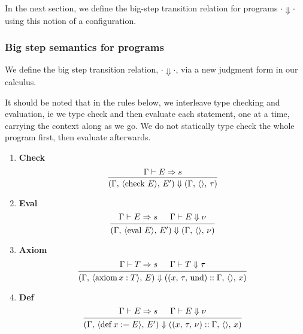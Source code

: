 \documentclass{article}
\begin{document}
In the next section, we define the big-step transition relation for programs $\cdot
\Downarrow \cdot$ using
this notion of a configuration.

\subsubsection{Big step semantics for programs}
We define the big step transition relation, $\cdot \Downarrow \cdot$, via a
new judgment form in our calculus.

It should be noted that in the rules below, we interleave type checking and 
evaluation, ie we type check and then evaluate each statement, one at a time,
carrying the context along as we go.
We do not statically type check the whole program first, then evaluate
afterwards.

\begin{enumerate}
\item \textbf{Check} \\
  \[
    \begin{prooftree}
      \hypo{\Gamma \vdash E \Rightarrow s}
      \infer1{(\Gamma, \, \langle \checkk \, E \rangle, \, E') \Downarrow
        (\Gamma, \, \langle \rangle, \, \tau)}
    \end{prooftree}
  \]

\item \textbf{Eval} \\
  \[
    \begin{prooftree}
      \hypo{\Gamma \vdash E \Rightarrow s}
      \hypo{\Gamma \vdash E \Downarrow \nu}
      \infer2{(\Gamma, \, \langle \evall \, E \rangle, \, E') \Downarrow
        (\Gamma, \, \langle \rangle, \, \nu)}
    \end{prooftree}
  \]

\item \textbf{Axiom} \\
  \[
    \begin{prooftree}
      \hypo{\Gamma \vdash T \Rightarrow s}
      \hypo{\Gamma \vdash T \Downarrow \tau}
      \infer2{(\Gamma, \, \langle \axiom x : T \rangle, \, E) \Downarrow
        ((x, \, \tau, \, \text{und}) :: \Gamma, \, \langle \rangle, \, x)}
    \end{prooftree}
  \]

\item \textbf{Def} \\
  \[
    \begin{prooftree}
      \hypo{\Gamma \vdash E \Rightarrow s}
      \hypo{\Gamma \vdash E \Downarrow \nu}
      \infer2{(\Gamma, \, \langle \deff x := E \rangle, \, E') \Downarrow
        ((x, \, \tau, \, \nu) :: \Gamma, \, \langle \rangle, \, x)}
    \end{prooftree}
  \]


\end{enumerate}
\end{document}
